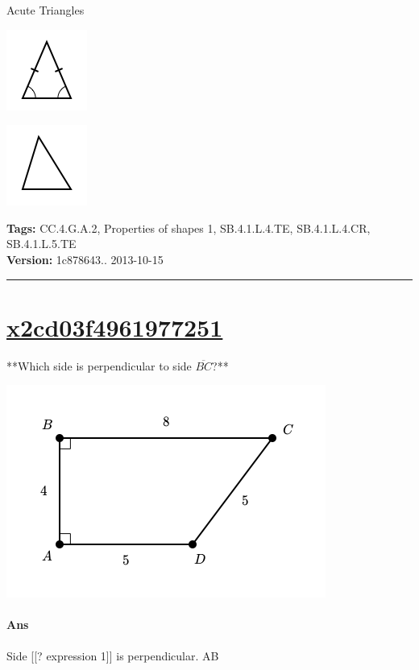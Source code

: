 \documentclass[twocolumn,10pt]{article}
\def\shrinkfactor{0.55}
\begin{document}
Acute Triangles


\includegraphics[scale=\shrinkfactor]{figures/dc310510e56d5d165e56b2b2a168163c503fe100.png}

\includegraphics[scale=\shrinkfactor]{figures/ee7f87a00acb47dec4f2b2eed9a6741b21afc47d.png}



\medskip
\noindent
\textbf{Tags:} {\footnotesize CC.4.G.A.2, Properties of shapes 1, SB.4.1.L.4.TE, SB.4.1.L.4.CR, SB.4.1.L.5.TE}\\
\textbf{Version:} 1c878643.. 2013-10-15
\smallskip\hrule





\section{\href{https://www.khanacademy.org/devadmin/content/items/x2cd03f4961977251}{x2cd03f4961977251}}

\noindent
**Which side is perpendicular to side $\overline{BC}$?**

\includegraphics[scale=\shrinkfactor]{figures/af1e22d3573a0a03d6cfa63d1c97705f69e1336c.png}

\paragraph{Ans} Side  [[? expression 1]] is perpendicular.
  AB
\end{document}
